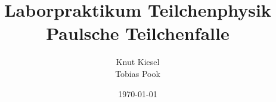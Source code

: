 \documentclass[a4paper,12pt]{article}
\title{Laborpraktikum Teilchenphysik\\ Paulsche Teilchenfalle}
\author{Knut Kiesel\\Tobias Pook}
\date{\today}
\begin{document}
\maketitle
\thispagestyle{empty}
\newpage
\tableofcontents
\setcounter{page}{1}
\newpage

\begin{figure}[htb]
		\centering
		\label{fig:lhc}
\end{figure}
\FloatBarrier
\end{document}
